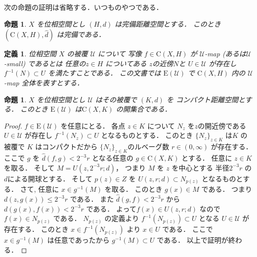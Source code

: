 \documentclass[leqno, a4paper, 12pt]{jsarticle}
\newtheorem{prop}[thm]{命題}
\newtheorem{df}[thm]{定義}
\newcommand{\yocovf}[1]{\mathcal{#1}}
\newcommand{\yosupmet}[1]{\widehat{#1}}
\newcommand{\yofuncsp}[2]{\mathrm{C}(#1, #2)}
\newcommand{\yofsusm}[1]{\mathrm{E}(#1)}
\numberwithin{equation}{section}
\begin{document}
次の命題の証明は省略する．いつものやつである．
\begin{prop}\label{prop:funccomp}
$X$
を位相空間とし
$(H, d)$
は完備距離空間とする．
このとき
$(\yofuncsp{X}{H}, \yosupmet{d})$
は完備である．
\end{prop}

\begin{df}
位相空間
$X$
の被覆
$\yocovf{U}$
について
写像
$f\in \yofuncsp{X}{H}$
が
$\yocovf{U}$-map
(あるは$\yocovf{U}$-small)
であるとは
任意の$z\in H$
についてある
$z$の近傍$N$と
$U\in \yocovf{U}$
が存在し
$f^{-1}(N)\subset U$
を満たすことである．
この文書では
$\yofsusm{\yocovf{U}}$
で
$\yofuncsp{X}{H}$
内の
$\yocovf{U}$-map
全体を表すとする．
\end{df}

\begin{prop}\label{prop:smallopen}
$X$
を位相空間とし
$\yocovf{U}$
はその被覆で
$(K, d)$
を
コンパクト距離空間とする．
このとき
$\yofsusm{\yocovf{U}}$
は$\yofuncsp{X}{K}$
の開集合である．
\end{prop}
\begin{proof}
$f\in \yofsusm{\yocovf{U}}$
を任意にとる．
各点
$z\in K$
について
$N_{z}$
を$z$の開近傍である
$U\in \yocovf{U}$
が存在し
$f^{-1}(N_{z})\subset U$
となるものとする．
このとき
$\{N_{z}\}_{z\in K}$
は$K$
の被覆で
$K$
はコンパクトだから
$\{N_{z}\}_{z\in K}$のルベーグ数
$r\in (0, \infty)$
が存在する．
ここで
$g$
を
$\yosupmet{d}(f, g)<2^{-3}r$
となる任意の
$g\in \yofuncsp{X}{K}$
とする．
任意に
$z\in K$
を取る．
そして
$M=U(z, 2^{-3}r; d)$，
つまり
$M$
を
$z$
を中心とする
半径$2^{-3}r$
の$d$による開球とする．
そして
$p(z)\in Z$
を
$U(z, r; d)\subset N_{p(z)}$
となるものとする．
さて,
任意に
$x\in g^{-1}(M)$
を取る．
このとき
$g(x)\in M$
である．
つまり
$d(z, g(x))\le 2^{-3}r$
である．
また
$\yosupmet{d}(g, f)<2^{-3}r$
から
$d(g(x), f(x))<2^{-3}r$
である．
よって$f(x)\in U(z, r; d)$
なので
$f(x)\in N_{p(z)}$
である．
$N_{p(z)}$
の定義より
$f^{-1}(N_{p(z)})\subset U$
となる
$U\in \yocovf{U}$
が存在する．
このとき
$x\in f^{-1}(N_{p(z)})$
より
$x\in U$
である．
ここで$x\in g^{-1}(M)$
は任意であったから
$g^{-1}(M)\subset U$
である．
以上で証明が終わる．
\end{proof}
\end{document}
